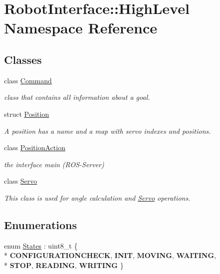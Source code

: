 \hypertarget{namespaceRobotInterface_1_1HighLevel}{}\section{Robot\+Interface\+:\+:High\+Level Namespace Reference}
\label{namespaceRobotInterface_1_1HighLevel}
\subsection*{Classes}
\begin{DoxyCompactItemize}
\item 
class \hyperlink{classRobotInterface_1_1HighLevel_1_1Command}{Command}
\begin{DoxyCompactList}\small\item\em class that contains all information about a goal. \end{DoxyCompactList}\item 
struct \hyperlink{structRobotInterface_1_1HighLevel_1_1Position}{Position}
\begin{DoxyCompactList}\small\item\em A position has a name and a map with servo indexes and positions. \end{DoxyCompactList}\item 
class \hyperlink{classRobotInterface_1_1HighLevel_1_1PositionAction}{Position\+Action}
\begin{DoxyCompactList}\small\item\em the interface \textquotesingle{}main\textquotesingle{} (R\+O\+S-\/\+Server) \end{DoxyCompactList}\item 
class \hyperlink{classRobotInterface_1_1HighLevel_1_1Servo}{Servo}
\begin{DoxyCompactList}\small\item\em This class is used for angle calculation and \hyperlink{classRobotInterface_1_1HighLevel_1_1Servo}{Servo} operations. \end{DoxyCompactList}\end{DoxyCompactItemize}
\subsection*{Enumerations}
\begin{DoxyCompactItemize}
\item 
enum \hyperlink{namespaceRobotInterface_1_1HighLevel_ab7122caf9a0b72cf97d406d33db38a7c}{States} \+: uint8\+\_\+t \{ \\*
{\bfseries C\+O\+N\+F\+I\+G\+U\+R\+A\+T\+I\+O\+N\+C\+H\+E\+CK}, 
{\bfseries I\+N\+IT}, 
{\bfseries M\+O\+V\+I\+NG}, 
{\bfseries W\+A\+I\+T\+I\+NG}, 
\\*
{\bfseries S\+T\+OP}, 
{\bfseries R\+E\+A\+D\+I\+NG}, 
{\bfseries W\+R\+I\+T\+I\+NG}
 \}
\end{DoxyCompactItemize}
